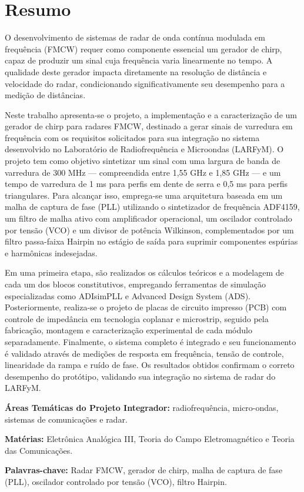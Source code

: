 \chapter*{Resumo} 

O desenvolvimento de sistemas de radar de onda contínua modulada em frequência (FMCW) requer como componente essencial um gerador de chirp, capaz de produzir um sinal cuja frequência varia linearmente no tempo. A qualidade deste gerador impacta diretamente na resolução de distância e velocidade do radar, condicionando significativamente seu desempenho para a medição de distâncias.

Neste trabalho apresenta-se o projeto, a implementação e a caracterização de um gerador de chirp para radares FMCW, destinado a gerar sinais de varredura em frequência com os requisitos solicitados para sua integração no sistema desenvolvido no Laboratório de Radiofrequência e Microondas (LARFyM). O projeto tem como objetivo sintetizar um sinal com uma largura de banda de varredura de 300 MHz — compreendida entre 1,55 GHz e 1,85 GHz — e um tempo de varredura de 1 ms para perfis em dente de serra e 0,5 ms para perfis triangulares. Para alcançar isso, emprega-se uma arquitetura baseada em um malha de captura de fase (PLL) utilizando o sintetizador de frequência ADF4159, um filtro de malha ativo com amplificador operacional, um oscilador controlado por tensão (VCO) e um divisor de potência Wilkinson, complementados por um filtro passa-faixa Hairpin no estágio de saída para suprimir componentes espúrias e harmônicas indesejadas.

Em uma primeira etapa, são realizados os cálculos teóricos e a modelagem de cada um dos blocos constitutivos, empregando ferramentas de simulação especializadas como ADIsimPLL e Advanced Design System (ADS). Posteriormente, realiza-se o projeto de placas de circuito impresso (PCB) com controle de impedância em tecnologia coplanar e microstrip, seguido pela fabricação, montagem e caracterização experimental de cada módulo separadamente. Finalmente, o sistema completo é integrado e seu funcionamento é validado através de medições de resposta em frequência, tensão de controle, linearidade da rampa e ruído de fase. Os resultados obtidos confirmam o correto desempenho do protótipo, validando sua integração no sistema de radar do LARFyM.

\vspace{1em}
\noindent\textbf{Áreas Temáticas do Projeto Integrador:} radiofrequência, micro-ondas, sistemas de comunicações e radar.

\noindent\textbf{Matérias:} Eletrônica Analógica III, Teoria do Campo Eletromagnético e Teoria das Comunicações. 

\noindent\textbf{Palavras-chave:} Radar FMCW, gerador de chirp, malha de captura de fase (PLL), oscilador controlado por tensão (VCO), filtro Hairpin.
